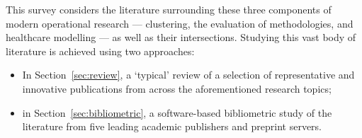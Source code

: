 This survey considers the literature surrounding these three components of
modern operational research --- clustering, the evaluation of methodologies, and
healthcare modelling --- as well as their intersections. Studying this vast body
of literature is achieved using two approaches:

\begin{itemize}
    \item In Section~\ref{sec:review}, a `typical' review of a selection of
        representative and innovative publications from across the
        aforementioned research topics;
    \item in Section~\ref{sec:bibliometric}, a software-based bibliometric study
        of the literature from five leading academic publishers and preprint
        servers.
\end{itemize}
